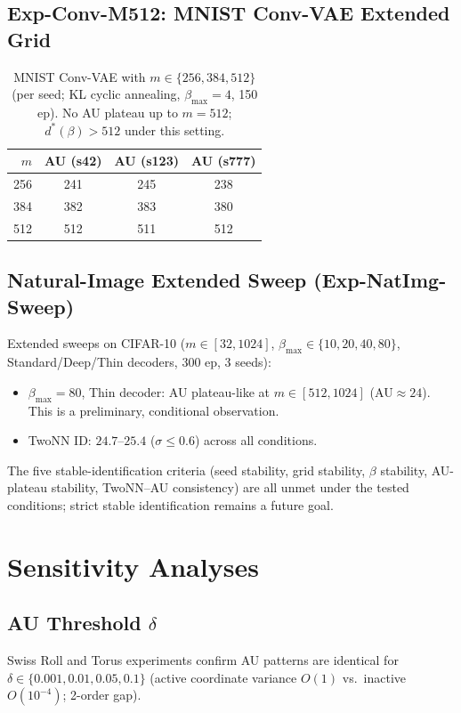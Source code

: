 \documentclass[11pt,a4paper]{article}
\begin{document}
\subsection{Exp-Conv-M512: MNIST Conv-VAE Extended Grid}

\begin{table}[H]
\centering
\caption{MNIST Conv-VAE with $m\in\{256,384,512\}$ (per seed; KL cyclic annealing,
$\beta_{\max}=4$, 150 ep).
No AU plateau up to $m=512$; $d^*(\beta)>512$ under this setting.}
\small
\begin{tabular}{rccc}
\toprule
$m$ & AU (s42) & AU (s123) & AU (s777) \\
\midrule
256 & 241 & 245 & 238 \\
384 & 382 & 383 & 380 \\
512 & 512 & 511 & 512 \\
\bottomrule
\end{tabular}
\end{table}

\subsection{Natural-Image Extended Sweep (Exp-NatImg-Sweep)}

Extended sweeps on CIFAR-10 ($m\in[32,1024]$, $\beta_{\max}\in\{10,20,40,80\}$,
Standard/Deep/Thin decoders, 300 ep, 3 seeds):
\begin{itemize}
\item $\beta_{\max}=80$, Thin decoder: AU plateau-like at $m\in[512,1024]$
  (AU$\approx24$). This is a preliminary, conditional observation.
\item TwoNN ID: $24.7$--$25.4$ ($\sigma\leq0.6$) across all conditions.
\end{itemize}
The five stable-identification criteria (seed stability, grid stability,
$\beta$ stability, AU-plateau stability, TwoNN--AU consistency) are all unmet
under the tested conditions; strict stable identification remains a future goal.

\section{Sensitivity Analyses}\label{app:sensitivity}

\subsection{AU Threshold $\delta$}\label{app:delta}
Swiss Roll and Torus experiments confirm AU patterns are identical for
$\delta\in\{0.001,0.01,0.05,0.1\}$ (active coordinate variance $O(1)$
vs.\ inactive $O(10^{-4})$; 2-order gap).
\end{document}
